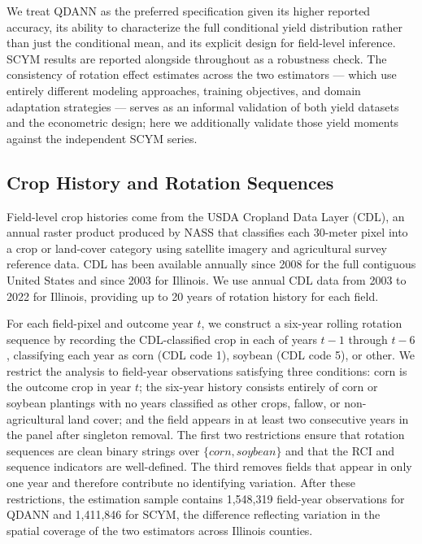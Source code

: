 \documentclass[11pt,letterpaper]{article}
\theoremstyle{remark}
\theoremstyle{plain}
\theoremstyle{definition}
\begin{document}
We treat QDANN as the preferred specification given its higher reported accuracy, its ability to characterize the full conditional yield distribution rather than just the conditional mean, and its explicit design for field-level inference. SCYM results are reported alongside throughout as a robustness check. The consistency of rotation effect estimates across the two estimators — which use entirely different modeling approaches, training objectives, and domain adaptation strategies — serves as an informal validation of both yield datasets and the econometric design; here we additionally validate those yield moments against the independent SCYM series.

\subsection{\label{subsec:rot_seq}Crop History and Rotation Sequences}
Field-level crop histories come from the USDA Cropland Data Layer (CDL), an annual raster product produced by NASS that classifies each 30-meter pixel into a crop or land-cover category using satellite imagery and agricultural survey reference data. CDL has been available annually since 2008 for the full contiguous United States and since 2003 for Illinois. We use annual CDL data from 2003 to 2022 for Illinois, providing up to 20 years of rotation history for each field.

For each field-pixel and outcome year $t$, we construct a six-year rolling rotation sequence by recording the CDL-classified crop in each of years $t-1$ through $t-6$, classifying each year as corn (CDL code 1), soybean (CDL code 5), or other. We restrict the analysis to field-year observations satisfying three conditions: corn is the outcome crop in year $t$; the six-year history consists entirely of corn or soybean plantings with no years classified as other crops, fallow, or non-agricultural land cover; and the field appears in at least two consecutive years in the panel after singleton removal. The first two restrictions ensure that rotation sequences are clean binary strings over $\{corn, soybean\}$ and that the RCI and sequence indicators are well-defined. The third removes fields that appear in only one year and therefore contribute no identifying variation. After these restrictions, the estimation sample contains 1,548,319 field-year observations for QDANN and 1,411,846 for SCYM, the difference reflecting variation in the spatial coverage of the two estimators across Illinois counties.
\end{document}
